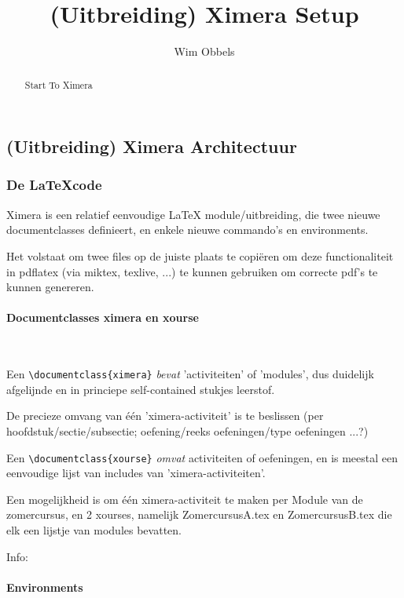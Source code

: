 \documentclass{ximera}
\author{Wim Obbels}
\title{(Uitbreiding) Ximera Setup}
\begin{document}
\begin{abstract}
	Start To Ximera
\end{abstract}
\maketitle


\subsection{(Uitbreiding) Ximera Architectuur}

\subsubsection{De \LaTeX code}

Ximera is een relatief eenvoudige LaTeX module/uitbreiding, die twee nieuwe documentclasses definieert, en enkele nieuwe commando's en environments.

Het volstaat om twee files op de juiste plaats te copiëren om deze functionaliteit in pdflatex (via miktex, texlive, ...)  te kunnen gebruiken om correcte pdf's te kunnen genereren.


\paragraph{Documentclasses ximera en xourse} \ 

Een \verb|\documentclass{ximera}| \textit{bevat} 'activiteiten' of 'modules', dus duidelijk afgelijnde en in princiepe self-contained stukjes leerstof. 

De precieze omvang van één 'ximera-activiteit' is te beslissen (per hoofdstuk/sectie/subsectie; oefening/reeks oefeningen/type oefeningen ...?)

Een \verb|\documentclass{xourse}| \textit{omvat}  activiteiten of oefeningen, en is meestal een eenvoudige lijst van includes van 'ximera-activiteiten'. 

Een mogelijkheid is om één ximera-activiteit te maken per Module van de zomercursus, en 2 xourses, namelijk ZomercursusA.tex en ZomercursusB.tex die elk een lijstje van modules bevatten.


Info: 

\paragraph{Environments} \ 
\end{document}
